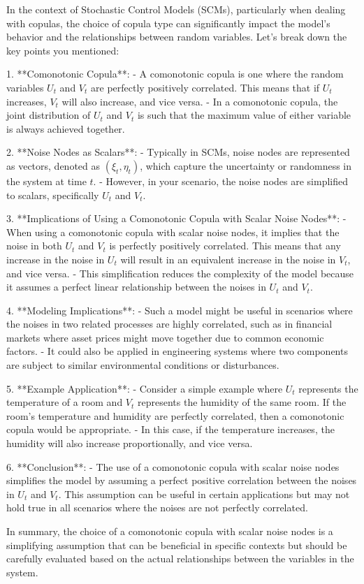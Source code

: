 In the context of Stochastic Control Models (SCMs), particularly when dealing with copulas, the choice of copula type can significantly impact the model's behavior and the relationships between random variables. Let's break down the key points you mentioned:

1. **Comonotonic Copula**:
   - A comonotonic copula is one where the random variables \( U_t \) and \( V_t \) are perfectly positively correlated. This means that if \( U_t \) increases, \( V_t \) will also increase, and vice versa.
   - In a comonotonic copula, the joint distribution of \( U_t \) and \( V_t \) is such that the maximum value of either variable is always achieved together.

2. **Noise Nodes as Scalars**:
   - Typically in SCMs, noise nodes are represented as vectors, denoted as \( (\xi_t, \eta_t) \), which capture the uncertainty or randomness in the system at time \( t \).
   - However, in your scenario, the noise nodes are simplified to scalars, specifically \( U_t \) and \( V_t \).

3. **Implications of Using a Comonotonic Copula with Scalar Noise Nodes**:
   - When using a comonotonic copula with scalar noise nodes, it implies that the noise in both \( U_t \) and \( V_t \) is perfectly positively correlated. This means that any increase in the noise in \( U_t \) will result in an equivalent increase in the noise in \( V_t \), and vice versa.
   - This simplification reduces the complexity of the model because it assumes a perfect linear relationship between the noises in \( U_t \) and \( V_t \).

4. **Modeling Implications**:
   - Such a model might be useful in scenarios where the noises in two related processes are highly correlated, such as in financial markets where asset prices might move together due to common economic factors.
   - It could also be applied in engineering systems where two components are subject to similar environmental conditions or disturbances.

5. **Example Application**:
   - Consider a simple example where \( U_t \) represents the temperature of a room and \( V_t \) represents the humidity of the same room. If the room's temperature and humidity are perfectly correlated, then a comonotonic copula would be appropriate.
   - In this case, if the temperature increases, the humidity will also increase proportionally, and vice versa.

6. **Conclusion**:
   - The use of a comonotonic copula with scalar noise nodes simplifies the model by assuming a perfect positive correlation between the noises in \( U_t \) and \( V_t \). This assumption can be useful in certain applications but may not hold true in all scenarios where the noises are not perfectly correlated.

In summary, the choice of a comonotonic copula with scalar noise nodes is a simplifying assumption that can be beneficial in specific contexts but should be carefully evaluated based on the actual relationships between the variables in the system.